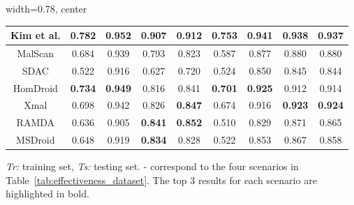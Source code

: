 \begin{table}[t]
\begin{adjustbox}{width=0.78\linewidth, center}
\begin{tabular}{@{}c|cccc|cccc@{}}
     Kim et al.& \multicolumn{1}{c|}{\textbf{0.782}}& \multicolumn{1}{c|}{\textbf{0.952}} & \multicolumn{1}{c|}{\textbf{0.907}}& \textbf{0.912} & \multicolumn{1}{c|}{\textbf{0.753}}& \multicolumn{1}{c|}{0.\textbf{941}} & \multicolumn{1}{c|}{\textbf{0.938}}& \textbf{0.937} \\ \midrule
     MalScan& \multicolumn{1}{c|}{0.684}& \multicolumn{1}{c|}{0.939} & \multicolumn{1}{c|}{0.793}& 0.823 & \multicolumn{1}{c|}{0.587}& \multicolumn{1}{c|}{0.877} & \multicolumn{1}{c|}{0.880}& 0.880 \\ \midrule
     SDAC& \multicolumn{1}{c|}{0.522}& \multicolumn{1}{c|}{0.916} & \multicolumn{1}{c|}{0.627}& 0.720 & \multicolumn{1}{c|}{0.524}& \multicolumn{1}{c|}{0.850} & \multicolumn{1}{c|}{0.845}& 0.844 \\ \midrule
     HomDroid & \multicolumn{1}{c|}{\textbf{0.734}}& \multicolumn{1}{c|}{\textbf{0.949}} & \multicolumn{1}{c|}{0.816}& 0.841 & \multicolumn{1}{c|}{\textbf{0.701}}& \multicolumn{1}{c|}{\textbf{0.925}} & \multicolumn{1}{c|}{0.912}& 0.914 \\ \midrule
     Xmal& \multicolumn{1}{c|}{0.698}& \multicolumn{1}{c|}{0.942} & \multicolumn{1}{c|}{0.826}& \textbf{0.847} & \multicolumn{1}{c|}{0.674}& \multicolumn{1}{c|}{0.916} & \multicolumn{1}{c|}{\textbf{0.923}}& \textbf{0.924} \\ \midrule
     RAMDA& \multicolumn{1}{c|}{0.636}& \multicolumn{1}{c|}{0.905} & \multicolumn{1}{c|}{\textbf{0.841}}& \textbf{0.852} & \multicolumn{1}{c|}{0.510}& \multicolumn{1}{c|}{0.829} & \multicolumn{1}{c|}{0.871}& 0.865 \\ \midrule
     MSDroid& \multicolumn{1}{c|}{0.648}& \multicolumn{1}{c|}{0.919} & \multicolumn{1}{c|}{\textbf{0.834}}&0.828 & \multicolumn{1}{c|}{0.522}& \multicolumn{1}{c|}{0.853} & \multicolumn{1}{c|}{0.867}& 0.858 \\ \bottomrule
     \end{tabular}
    \end{adjustbox}
    \label{tab:res_ratio}
    \begin{tablenotes}[flushleft, labelsep=0]
 \footnotesize
 \item \textit{Tr:} training set, \textit{Ts:} testing set.  -  correspond to the four scenarios in Table~\ref{tab:effectiveness_dataset}. The top 3 results for each scenario are highlighted in bold.
 \end{tablenotes}
    \vspace{-0.5cm}
\end{table}

